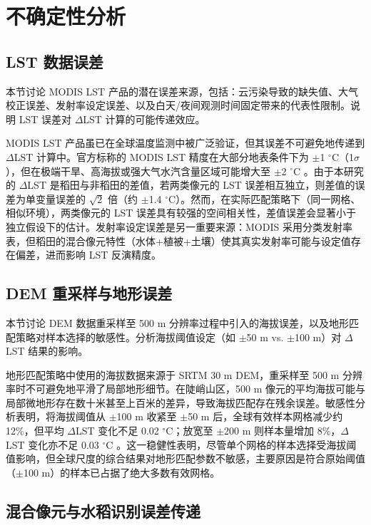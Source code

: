 \section{不确定性分析}

\subsection{LST 数据误差}

本节讨论 MODIS LST 产品的潜在误差来源，包括：云污染导致的缺失值、大气校正误差、发射率设定误差、以及白天/夜间观测时间固定带来的代表性限制。说明 LST 误差对 $\Delta$LST 计算的可能传递效应。

MODIS LST 产品虽已在全球温度监测中被广泛验证，但其误差不可避免地传递到 $\Delta$LST 计算中。官方标称的 MODIS LST 精度在大部分地表条件下为 $\pm$1 $^{\circ}\mathrm{C}$（1$\sigma$），但在极端干旱、高海拔或强大气水汽含量区域可能增大至 $\pm$2 $^{\circ}\mathrm{C}$ \cite{Huete2002}。由于本研究的 $\Delta$LST 是稻田与非稻田的差值，若两类像元的 LST 误差相互独立，则差值的误差为单变量误差的 $\sqrt{2}$ 倍（约 $\pm$1.4 $^{\circ}\mathrm{C}$）。然而，在实际匹配策略下（同一网格、相似环境），两类像元的 LST 误差具有较强的空间相关性，差值误差会显著小于独立假设下的估计。发射率设定误差是另一重要来源：MODIS 采用分类发射率表，但稻田的混合像元特性（水体+植被+土壤）使其真实发射率可能与设定值存在偏差，进而影响 LST 反演精度。

\subsection{DEM 重采样与地形误差}

本节讨论 DEM 数据重采样至 500 m 分辨率过程中引入的海拔误差，以及地形匹配策略对样本选择的敏感性。分析海拔阈值设定（如 $\pm$50 m vs. $\pm$100 m）对 $\Delta$LST 结果的影响。

地形匹配策略中使用的海拔数据来源于 SRTM 30 m DEM，重采样至 500 m 分辨率时不可避免地平滑了局部地形细节。在陡峭山区，500 m 像元的平均海拔可能与局部微地形存在数十米甚至上百米的差异，导致海拔匹配存在残余误差。敏感性分析表明，将海拔阈值从 $\pm$100 m 收紧至 $\pm$50 m 后，全球有效样本网格减少约 12\%，但平均 $\Delta$LST 变化不足 0.02 $^{\circ}\mathrm{C}$；放宽至 $\pm$200 m 则样本量增加 8\%，$\Delta$LST 变化亦不足 0.03 $^{\circ}\mathrm{C}$ \cite{Weng2025}。这一稳健性表明，尽管单个网格的样本选择受海拔阈值影响，但全球尺度的综合结果对地形匹配参数不敏感，主要原因是符合原始阈值（$\pm$100 m）的样本已占据了绝大多数有效网格。

\subsection{混合像元与水稻识别误差传递}

